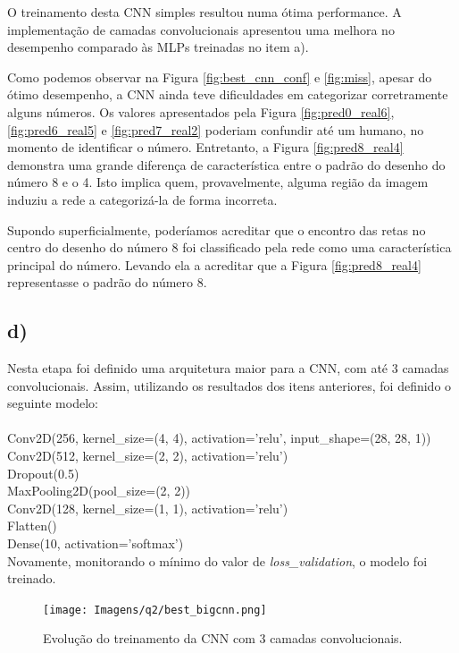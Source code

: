 \documentclass[12pt]{article}
\begin{document}
O treinamento desta CNN simples resultou numa ótima performance. A implementação de camadas convolucionais apresentou uma melhora no desempenho comparado às MLPs treinadas no item a). 

Como podemos observar na Figura \ref{fig:best_cnn_conf} e \ref{fig:miss}, apesar do ótimo desempenho, a CNN ainda teve dificuldades em categorizar corretramente alguns números. Os valores apresentados pela Figura \ref{fig:pred0_real6},\ref{fig:pred6_real5} e \ref{fig:pred7_real2} poderiam confundir até um humano, no momento de identificar o número. Entretanto, a Figura \ref{fig:pred8_real4} demonstra uma grande diferença de característica entre o padrão do desenho do número 8 e o 4. Isto implica quem, provavelmente, alguma região da imagem induziu a rede a categorizá-la de forma incorreta. 

Supondo superficialmente, poderíamos acreditar que o encontro das retas no centro do desenho do número 8 foi classificado pela rede como uma característica principal do número. Levando ela a acreditar que a Figura \ref{fig:pred8_real4} representasse o padrão do número 8.


\subsection*{d)}

Nesta etapa foi definido uma arquitetura maior para a CNN, com até 3 camadas convolucionais. Assim, utilizando os resultados dos itens anteriores, foi definido o seguinte modelo:\\
\\
Conv2D(256, kernel\_size=(4, 4), activation='relu', input\_shape=(28, 28, 1))\\
Conv2D(512, kernel\_size=(2, 2), activation='relu')\\
Dropout(0.5)\\
MaxPooling2D(pool\_size=(2, 2))\\
Conv2D(128, kernel\_size=(1, 1), activation='relu')\\
Flatten()\\
Dense(10, activation='softmax')\\

Novamente, monitorando o mínimo do valor de \textit{loss\_validation}, o modelo foi treinado.


\begin{figure}[H]
	\centering
	\texttt{[image: Imagens/q2/best\_bigcnn.png]}
	\caption{Evolução do treinamento da CNN com 3 camadas convolucionais.}
	\label{fig:best_bigcnn}
\end{figure}
\end{document}

